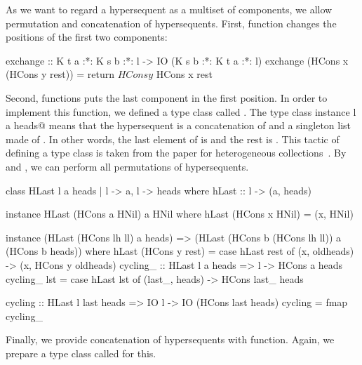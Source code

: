 As we want to regard a hypersequent as a multiset of components, we allow
permutation and concatenation of hypersequents.
First, \verb@exchange@ function changes the positions of the first two
components:
\begin{code}
exchange :: K t a :*: K s b :*: l ->
            IO (K s b :*: K t a :*: l)
exchange (HCons x (HCons y rest)) =
  return $ HCons y $ HCons x rest
\end{code}
Second, \verb@cycling@ functions puts the last component in the first position.
In order to implement this function, we defined a type class called
\verb@HLast@.
The type class instance \verb@HLast l a heads@ means that the hypersequent \verb@l@
is a concatenation of \verb@heads@ and a singleton list made of \verb@a@.  In
other words, the last element of \verb@l@ is \verb@a@ and the rest is \verb@heads@.
This tactic of defining a type class is taken from the paper for
heterogeneous collections~\citep{hetero}.
By \verb@exchange@ and \verb@cycling@, we can perform all permutations of
hypersequents.
\begin{code}
class HLast l a heads | l -> a, l -> heads
 where hLast :: l -> (a, heads)

instance HLast (HCons a HNil) a HNil
    where hLast (HCons x HNil) = (x, HNil)

instance (HLast (HCons lh ll) a heads) =>
  (HLast (HCons b (HCons lh ll)) a (HCons b heads))
    where hLast (HCons y rest) =
              case hLast rest of
                (x, oldheads) -> (x, HCons y oldheads)
cycling_ :: HLast l a heads => l -> HCons a heads
cycling_ lst = case hLast lst of
                (last_, heads) -> HCons last_ heads

cycling :: HLast l last heads =>
  IO l -> IO (HCons last heads)
cycling = fmap cycling_
\end{code}
Finally, we provide concatenation of hypersequents with \verb@follows@
function.
Again, we prepare a type class called \verb@HAppend@ for this.

